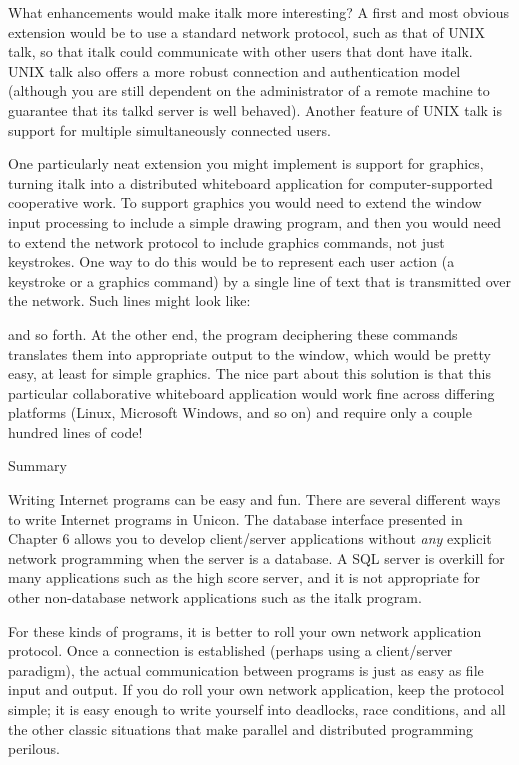 What enhancements would make \textsf{italk} more interesting? A first
and most obvious extension would be to use a standard network protocol,
such as that of UNIX \textsf{talk}, so that \textsf{italk} could
communicate with other users that don{\textquotesingle}t have
\textsf{italk}. UNIX \textsf{talk} also offers a more robust connection
and authentication model (although you are still dependent on the
administrator of a remote machine to guarantee that its \textsf{talkd}
server is well behaved). Another feature of UNIX \textsf{talk} is
support for multiple simultaneously connected users.

One particularly neat extension you might implement is support for
graphics, turning \textsf{italk} into a distributed whiteboard
application for computer-supported cooperative work. To support
graphics you would need to extend the window input processing to
include a simple drawing program, and then you would need to extend the
network protocol to include graphics commands, not just keystrokes. One
way to do this would be to represent each user action (a keystroke or a
graphics command) by a single line of text that is transmitted over the
network. Such lines might look like:


and so forth. At the other end, the program deciphering these commands
translates them into appropriate output to the window, which would be
pretty easy, at least for simple graphics. The nice part about this
solution is that this particular collaborative whiteboard application
would work fine across differing platforms (Linux, Microsoft Windows,
and so on) and require only a couple hundred lines of code!

{\sffamily
Summary}

Writing Internet programs can be easy and fun. There are several
different ways to write Internet programs in Unicon. The
database interface presented in Chapter 6 allows you to
develop client/server applications without \textit{any} explicit
network programming when the server is a database. A SQL
server is overkill for many applications such as the high score server,
and it is not appropriate for other non-database network applications
such as the \textsf{italk} program.

For these kinds of programs, it is better to {\textquotedbl}roll your
own{\textquotedbl} network application protocol. Once a connection is
established (perhaps using a client/server paradigm), the actual
communication between programs is just as easy as file input and
output. If you do roll your own network application, keep the protocol
simple; it is easy enough to write yourself into deadlocks, race
conditions, and all the other classic situations that make parallel and
distributed programming perilous.

